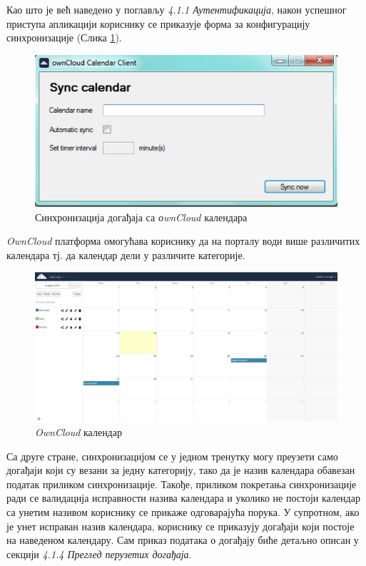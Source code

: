 Као што је већ наведено у поглављу \textit{4.1.1 Аутентификација}, након успешног приступа апликацији кориснику се приказује форма за конфигурацију синхронизације (Слика \ref{fig:sync_calendar}).

\begin{figure}[H]
	\centering
	\includegraphics[scale=0.5]{slike/SyncCalendar.png}
	\caption{Синхронизација догађаја са \textit{оwnCloud} календара}
	\label{fig:sync_calendar}
\end{figure}

\textit{OwnCloud} платформа омогућава кориснику да на порталу води више различитих календара тј. да календар дели у различите категорије. 

\begin{figure}[H]
	\centering
	\includegraphics[scale=0.5]{slike/ownCloudCalendar.png}
	\caption{\textit{OwnCloud} календар}
	\label{fig:own_cloud_calendar}
\end{figure}

Са друге стране, синхронизацијом се у једном тренутку могу преузети само догађаји који су везани за једну категорију, тако да је назив календара обавезан податак приликом синхронизације. Такође, приликом покретања синхронизације ради се валидација исправности назива календара и уколико не постоји календар са унетим називом кориснику се прикаже одговарајућа порука. У супротном, ако је унет исправан назив календара, кориснику се приказују догађаји који постоје на наведеном календару. Сам приказ података о догађају биће детаљно описан у секцији \textit{4.1.4 Преглед перузетих догађаја}.

